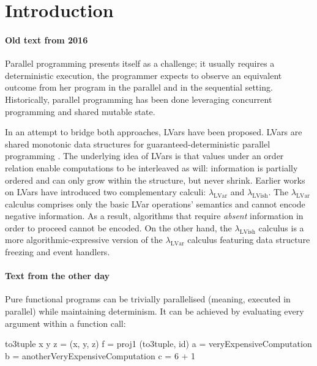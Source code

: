 \documentclass[main.tex]{subfiles}
\begin{document}
\section{Introduction}


\paragraph{Old text from 2016}
Parallel programming presents itself as a challenge; it usually
requires a deterministic execution, \ie the programmer expects to observe an equivalent
outcome from her program in the parallel and in the sequential setting.
Historically, parallel programming has been done leveraging concurrent
programming and shared mutable state.

In an attempt to bridge both approaches, LVars have been proposed.
LVars are shared monotonic data structures for
guaranteed-deterministic parallel programming \cite{kuper15}. The underlying idea
of LVars is that values under an order relation enable computations to be interleaved as will:
information is partially ordered and can only grow
within the structure, but never shrink. Earlier works
on LVars have introduced two complementary calculi: $\lambda_{\text{LVar}}$ and
$\lambda_{\text{LVish}}$. The $\lambda_{\text{LVar}}$ calculus comprises only the
basic LVar operations' semantics and cannot encode negative information. As a
result, algorithms that require \textit{absent} information in order to proceed cannot
be encoded. On the other hand, the $\lambda_{\text{LVish}}$ calculus is a more
algorithmic-expressive version of the
$\lambda_{\text{LVar}}$ calculus featuring data structure freezing and event
handlers.

\paragraph{Text from the other day}
Pure functional programs can be trivially parallelised (meaning, executed in parallel) while maintaining determinism. It can be achieved by evaluating every argument within a function call:

to3tuple x y z = (x, y, z)
f = proj1 (to3tuple, id)
a = veryExpensiveComputation
b = anotherVeryExpensiveComputation
c = 6 + 1
\end{document}
